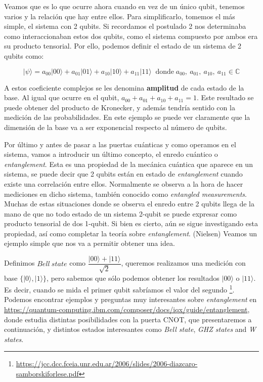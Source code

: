  Veamos que es lo que ocurre ahora cuando en vez de un único qubit, tenemos varios y la relación que hay entre ellos. Para simplificarlo, tomemos el más simple, el sistema con 2 qubits. Si recordamos el postulado 2 nos determinaba como interaccionaban estos dos qubits, como el sistema compuesto por ambos era su producto tensorial. Por ello, podemos definir el estado de un sistema de 2 qubits como:

    \begin{equation*}|\psi\rangle = a_{00}|00\rangle + a_{01}|01\rangle + a_{10}|10\rangle + a_{11}|11\rangle \;\;\text{donde}\; a_{00},\: a_{01}, \:a_{10}, \:a_{11} \in \mathbb{C}
    \end{equation*}

 A estos coeficiente complejos se les denomina \textbf{amplitud} de cada estado de la base. Al igual que ocurre en el qubit, $a_{00}+a_{01}+a_{10}+a_{11}=1$. Este resultado se puede obtener del producto de Kronecker, y además tendría sentido con la medición de las probabilidades. En este ejemplo se puede ver claramente que la dimensión de la base va a ser exponencial respecto al número de qubits.\newline
 
 Por último y antes de pasar a las puertas cuánticas y como operamos en el sistema, vamos a introducir un último concepto, el enredo cuántico o \textit{entanglement}. Esta es una propiedad de la mecánica cuántica que aparece en un sistema, se puede decir que 2 qubits están en estado de \textit{entanglement} cuando existe una correlación entre ellos. Normalmente se observa a la hora de hacer mediciones en dicho sistema, también conocido como \textit{entangled measurements}. Muchas de estas situaciones donde se observa el enredo entre 2 qubits llega de la mano de que no todo estado de un sistema 2-qubit se puede expresar como producto tensorial de dos 1-qubit. Si bien es cierto, aún se sigue investigando esta propiedad, así como completar la teoría sobre \textit{entanglement}. (Nielsen)  Veamos un ejemplo simple que nos va a permitir obtener una idea. \newline

 Definimos $Bell\:state $ como $ \dfrac{|00\rangle + |11\rangle}{\sqrt{2}}$, queremos realizamos una medición con base $\{|0\rangle,|1\rangle\}$, pero sabemos que sólo podemos obtener los resultados $|00\rangle$ o $|11\rangle$. Es decir, cuando se mida el primer qubit sabríamos el valor del segundo \footnote{\url{https://jcc.dcc.fceia.unr.edu.ar/2006/slides/2006-diazcaro-samborskiforlese.pdf}}. Podemos encontrar ejemplos y preguntas muy interesantes sobre \textit{entanglement} en \url{https://quantum-computing.ibm.com/composer/docs/iqx/guide/entanglement}, donde estudia distintas posibilidades con la puerta CNOT, que presentaremos a continuación, y distintos estados interesantes como \textit{Bell state}, \textit{GHZ states} and \textit{W states}.


